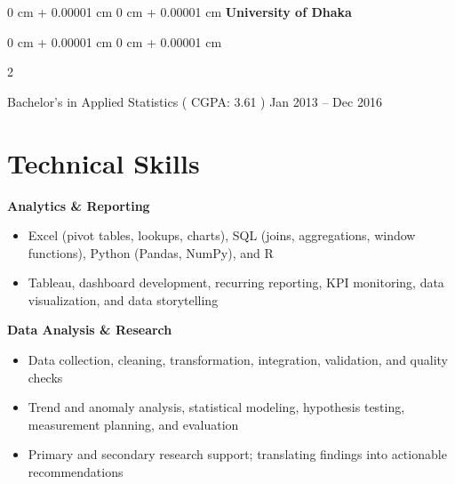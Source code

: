 \documentclass[10pt, letterpaper]{article}
\newenvironment{highlights}{
    \begin{itemize}[
        topsep=0.10 cm,
        parsep=0.10 cm,
        partopsep=0pt,
        itemsep=0pt,
        leftmargin=0 cm + 10pt
    ]
}{
    \end{itemize}
} %
\newenvironment{onecolentry}{
    \begin{adjustwidth}{
        0 cm + 0.00001 cm
    }{
        0 cm + 0.00001 cm
    }
}{
    \end{adjustwidth}
} %
\newenvironment{twocolentry}[2][]{
    \onecolentry
    \def\secondColumn{#2}
    \setcolumnwidth{\fill, 4.5 cm}
    \begin{paracol}{2}
}{
    \switchcolumn \raggedleft \secondColumn
    \end{paracol}
    \endonecolentry
} %
\begin{document}
            \vspace{0.20 cm}
     \begin{onecolentry}{
    \textbf{University of Dhaka}
    }
    \end{onecolentry}        
    \begin{twocolentry}{
            Jan 2013 – Dec 2016
        }
            Bachelor's in Applied Statistics ( CGPA: 3.61 )\end{twocolentry}
        \vspace{0.10 cm}


\section*{Technical Skills}

\textbf{Analytics \& Reporting}
\begin{itemize}
    \item Excel (pivot tables, lookups, charts), SQL (joins, aggregations, window functions), Python (Pandas, NumPy), and R
    \item Tableau, dashboard development, recurring reporting, KPI monitoring, data visualization, and data storytelling
\end{itemize}

\textbf{Data Analysis \& Research}
\begin{itemize}
    \item Data collection, cleaning, transformation, integration, validation, and quality checks
    \item Trend and anomaly analysis, statistical modeling, hypothesis testing, measurement planning, and evaluation
    \item Primary and secondary research support; translating findings into actionable recommendations
\end{itemize}
\end{document}
